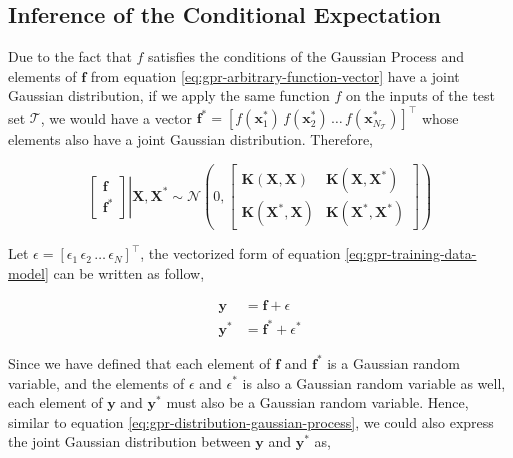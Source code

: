 \begin{spacing}{2.0}
    \subsection{Inference of the Conditional Expectation}

    Due to the fact that $f$ satisfies the conditions of the Gaussian Process and elements of $\mathbf{f}$ from equation \ref{eq:gpr-arbitrary-function-vector}
    have a joint Gaussian distribution, if we apply the same function $f$ on the inputs of the test set $\mathcal{T}$, we would have a vector
    $\mathbf{f}^* = \left[f(\mathbf{x}_1^*)\,f(\mathbf{x}_2^*)\,\ldots\,f(\mathbf{x}_{N_{\mathcal{T}}}^*)\right]^{\top}$ whose elements also have a 
    joint Gaussian distribution. Therefore, \cite{B-GaussianProcessML-Rasmussen}

    \begin{equation}
        \left.\begin{bmatrix}
            \mathbf{f} \\ \mathbf{f}^*
        \end{bmatrix}\right|\mathbf{X},\mathbf{X}^* \sim \mathcal{N}\left(0,
            \begin{bmatrix}
                \mathbf{K}(\mathbf{X},\mathbf{X}) & \mathbf{K}(\mathbf{X},\mathbf{X}^*) \\
                \mathbf{K}(\mathbf{X}^*,\mathbf{X}) & \mathbf{K}(\mathbf{X}^*,\mathbf{X}^*)
            \end{bmatrix}
        \right)
        \label{eq:gpr-distribution-gaussian-process}
    \end{equation}

    Let $\epsilon = \left[\epsilon_1\,\epsilon_2\,\ldots\,\epsilon_N\right]^{\top}$, the vectorized form of equation \ref{eq:gpr-training-data-model} can
    be written as follow,

    \begin{equation}\begin{aligned}
        \mathbf{y} &= \mathbf{f} + \epsilon \\
        \mathbf{y}^* &= \mathbf{f}^* + \epsilon^*
    \end{aligned}\end{equation}

    Since we have defined that each element of $\mathbf{f}$ and $\mathbf{f}^*$ is a Gaussian random variable, and the elements of $\epsilon$ and $\epsilon^*$
    is also a Gaussian random variable as well, each element of $\mathbf{y}$ and $\mathbf{y}^*$ must also be a Gaussian random variable. Hence, similar to 
    equation \ref{eq:gpr-distribution-gaussian-process}, we could also express the joint Gaussian distribution between $\mathbf{y}$ and $\mathbf{y}^*$ as,


\end{spacing}
